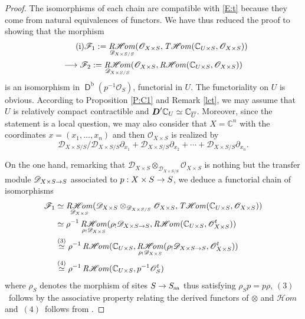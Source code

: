\documentclass[english]{smfart}
\numberwithin{subsection}{section}
\def\shd{\mathcal{D}}\let\cD\shd
\def\shf{\mathcal{F}}\let\cF F
\def\sho{\mathcal{O}}\let\cO\sho
\newcommand{\C}{\mathbb{C}}\let\CC\C
\newcommand{\bD}{\boldsymbol{D}}
\newcommand{\shhom}{\mathcal{H}\!\mathit{om}}\let\ho\shhom
\DeclareMathOperator{\rh}{\mathit{R}\shhom}
\DeclareMathOperator{\tho}{\mathit{T}\shhom}
\newcommand{\rb}{\mathrm{b}}
\newcommand{\sa}{\mathrm{sa}}
\newcommand{\XS}{X\times S}
\newcommand{\DXS}{\shd_{\XS/S}}
\DeclareMathOperator{\rD}{\mathsf{D}}
\let\ov\overline
\newcommand{\pOS}{p^{-1}\sho_S}
\numberwithin{equation}{section}
\theoremstyle{plain}
\theoremstyle{definition}
\def\to{\mathchoice{\longrightarrow}{\rightarrow}{\rightarrow}{\rightarrow}}
\begin{document}
\begin{proof}
The isomorphisms of each chain are compatible with \eqref{E:t} because they come from natural equivalences of functors. We have thus reduced the proof to showing that the morphism
\begin{multline*}
\tag{i}
\shf_1:=\rh_{\DXS}(\cO_{\XS}, \tho(\CC_{U\times S},\cO_{\XS}))\\
\to \shf_2:=\rh_{\DXS}(\cO_{\XS}, \rh(\CC_{U\times S},\cO_{\XS}))
\end{multline*}
is an isomorphism in $\rD^ \rb(\pOS)$, functorial in $U$. The functoriality on $U$ is obvious. According to Proposition \ref{P:C1} and Remark \ref{lct}, we may assume that $U$ is relatively compact contractible and $\bD'\CC_U\simeq\nobreak\CC_{\ov U}$. Moreover, since the statement is a local question, we may also consider that $X=\C^n$ with the coordinates $x=(x_1,\dots, x_n)$ and then $\sho_{\XS}$ is realized by
\[
{\DXS}/\DXS\partial_{x_1}+\DXS\partial_{x_{2}}+\cdots+\DXS\partial_{x_n}.
\]

On the one hand, remarking that $\shd_{\XS}\otimes _{\DXS}\sho_{\XS}$ is nothing but the transfer module $\shd_{\XS\to S}$ associated to $p:\XS\to S$, we deduce a functorial chain of isomorphisms
\begin{align*}
\shf_1
&\simeq\rh_{\shd_{\XS}}(\shd_{\XS}\otimes _{\DXS}\cO_{\XS}, \tho(\CC_{U\times S},\cO_{\XS}))\\
&\simeq\rho^{-1}\rh_{\rho_!\shd_{\XS}}(\rho_!\shd_{\XS\to S}, \rh(\CC_{U\times S},\cO^t_{\XS}))\\
&\overset{(3)}\simeq \rho^{-1}\rh(\CC_{U\times S}, \rh_{\rho_!\shd_{\XS}}(\rho_!\shd_{\XS\to S}, \cO^t_{\XS}))\\
&\overset{(4)}\simeq \rho^{-1}\rh(\CC_{U\times S}, \pOS^t)
\end{align*}
where $\rho_S$ denotes the morphism of sites $S\to S_\sa$ thus satisfying $\rho_S p=p\rho$, $(3)$~follows by the associative property relating the derived functors of $\otimes$ and $\ho$ and~$(4)$~follows from \cite[Cor.\,A.3.7]{Prelli13}.


\end{proof}
\end{document}
